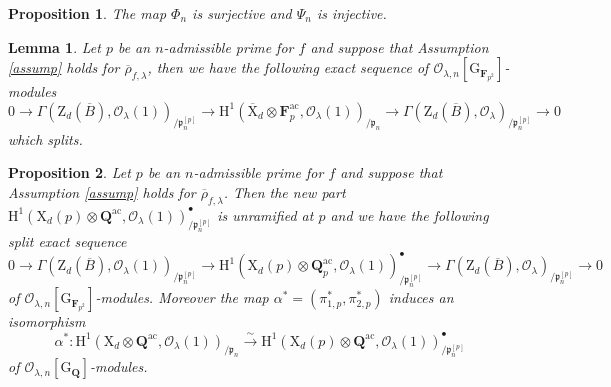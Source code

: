 \documentclass[10pt,a4paper]{amsart}
\newtheorem{proposition}{Proposition}
\newtheorem{lemma}{Lemma}
\def\FF{\mathbf{F}}
\def\QQ{\mathbf{Q}}
\def\Qbar{\QQ^{\ac}}
\def\ac{\mathrm{ac}}
\def\calO{\mathcal{O}}
\def\frakp{\mathfrak{p}}
\def\rmG{\mathrm{G}}
\def\rmH{\mathrm{H}}
\def\rmX{\mathrm{X}}
\def\rmZ{\mathrm{Z}}
\begin{document}
\begin{proposition}\label{Phi-n}
The map $\Phi_{n}$ is surjective and $\Psi_{n}$ is injective.
\end{proposition}

\begin{lemma}\label{canonical-decomposition}
Let $p$ be an $n$-admissible prime for $f$ and suppose that Assumption \ref{assump} holds for $\overline{\rho}_{f,\lambda}$, then we have the following exact sequence of $\calO_{\lambda, n}[\rmG_{\FF_{p^{2}}}]$-modules
\begin{equation*}
0\rightarrow\Gamma(\rmZ_{d}(\overline{B}), \calO_{\lambda}(1))_{/\frakp^{[p]}_{n}}\rightarrow \rmH^{1}(\overline{\rmX}_{d}\otimes{\FF^{\ac}_{p}}, \calO_{\lambda}(1))_{/\frakp_{n}}\rightarrow \Gamma(\rmZ_{d}(\overline{B}), \calO_{\lambda})_{/\frakp^{[p]}_{n}}\rightarrow0
\end{equation*}
which splits.
\end{lemma}

\begin{proposition}\label{new-old-part}
Let $p$ be an $n$-admissible prime for $f$ and suppose that Assumption \ref{assump} holds for $\overline{\rho}_{f,\lambda}$. Then the new part $\rmH^{1}({\rmX}_{d}(p)\otimes{\QQ^{\ac}}, \calO_{\lambda}(1))^{\bullet}_{/\frakp^{[p]}_{n}}$ is unramified at $p$ and we have the following split exact sequence
\begin{equation*}
0\rightarrow\Gamma(\rmZ_{d}(\overline{B}), \calO_{\lambda}(1))_{/\frakp^{[p]}_{n}}\rightarrow \rmH^{1}({\rmX}_{d}(p)\otimes{\QQ^{\ac}_{p}}, \calO_{\lambda}(1))^{\bullet}_{/\frakp^{[p]}_{n}}\rightarrow \Gamma(\rmZ_{d}(\overline{B}), \calO_{\lambda})_{/\frakp^{[p]}_{n}}\rightarrow0
\end{equation*}
of $\calO_{\lambda, n}[\rmG_{\FF_{p^{2}}}]$-modules.
Moreover the map $\alpha^{\ast}=(\pi^{\ast}_{1,p}, \pi^{\ast}_{2,p})$ induces an isomorphism 
\begin{equation*}
\alpha^{\ast}: \rmH^{1}({\rmX}_{d}\otimes{\Qbar}, \calO_{\lambda}(1))_{/\frakp_{n}}\xrightarrow{\sim} \rmH^{1}(\rmX_{d}(p)\otimes{\Qbar}, \calO_{\lambda}(1))^{\bullet}_{/\frakp^{[p]}_{n}}
\end{equation*}
of $\calO_{\lambda, n}[\rmG_{\QQ}]$-modules.
\end{proposition}
\end{document}
